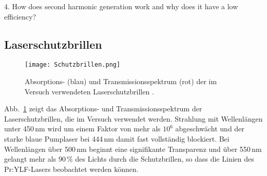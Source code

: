 4. How does second harmonic generation work and why does it have a low
efficiency?



\subsection{Laserschutzbrillen}

\begin{figure}[H]
\begin{center}
  \texttt{[image: Schutzbrillen.png]}
  \caption{Absorptions- (blau)  und Transmissionsspektrum (rot) der im Versuch
  verwendeten Laserschutzbrillen \cite{Versuchsanleitung}.}
  \label{img:Schutzbrillen}
\end{center}
\end{figure}

Abb.~\ref{img:Schutzbrillen} zeigt das Absorptions- und Transmissionsspektrum der
Laserschutzbrillen, die im Versuch verwendet werden.
Strahlung mit Wellenlängen unter 450\,nm wird um einem Faktor von mehr als $10^6$ abgeschwächt und
der starke blaue Pumplaser bei 444\,nm damit fast vollständig blockiert.
Bei Wellenlängen über 500\,nm beginnt eine signifikante Transparenz und über 550\,nm gelangt mehr
als 90\,\% des Lichts durch die Schutzbrillen,
so dass die Linien des Pr:YLF-Lasers beobachtet werden können.

